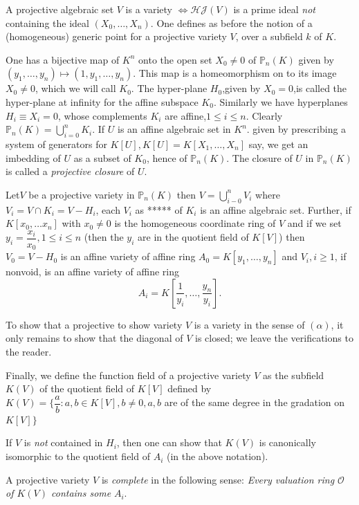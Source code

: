 A projective algebraic set $V$ is a variety $\Longleftrightarrow
\mathscr{H} \mathcal{J}(V)$ is a prime ideal \textit{ not } containing
the ideal $(X_0,\ldots,X_n)$. One defines as before the notion of a
(homogeneous) generic point for a projective variety $V$, over a
subfield $k$ of $K$. 
   
One has a bijective map of $K^n$ onto the open set $X_0 \neq 0$ of
$\mathbb{P}_n (K)$ given by $(y_1,\ldots,y_n)  \longmapsto
(1, y_1,\ldots,y_n)$. This map is a homeomorphism on to its
image $X_0 \neq 0$, which we will call $K_0$. The hyper-plane
$H_0$,given by $X_0 = 0$,is  
called the hyper-plane at infinity for the affine subspace
$K_0$. Similarly we have hyperplanes $H_i \equiv X_i =0$, whose
complements $K_i$ are affine,$1\leq i\leq n$. Clearly $\mathbb{P}_n
(K) = \bigcup \limits^{n}_{i=0} K_i$. If $U$ is an affine algebraic
set in $K^n$. given by prescribing a system of generators for $K[U],
K[U] = K[X_1,\ldots,X_n]$ say, we get an imbedding of $U$ as a subset
of $K_0$, hence of $\mathbb{P}_n(K)$. The closure of $U$ in
$\mathbb{P}_n (K)$ is called a \textit{ projective closure } of $U$. 

Let\pageoriginale $V$ be a projective variety in $\mathbb{P}_n (K)$ then $V= \bigcup
\limits^{n}_{i-0} V_i$ 
where $V_i = V \cap K_i = V-H_i$, each $V_i$ as ***** of $K_i$ is an
affine algebraic set. Further, if $K[x_0,\ldots x_n]$ with $x_0 \neq 0$
is the homogeneous coordinate ring of $V$ and if we set $y_i =
\dfrac{x_i}{x_0}, 1\leq i\leq n$ (then the $y_i$ are in the quotient
field of $K[V]$)  then $V_0  = V-H_0$ is an affine variety of affine
ring $A_0 = K[y_1,\ldots,y_n]$ and $V_i, i\ge 1$, if nonvoid, is an
affine variety of affine ring  
$$
A_i = K\left[\dfrac{1}{y_i},\ldots,\dfrac{y_n}{y_i}\right].
$$   

To show that a projective to show variety $V$ is a variety in the
sense of $(\alpha)$, it only remains to show that the diagonal of $V$
is closed; we leave the verifications to the reader. 

Finally, we define the function field of a projective variety $V$ as
the subfield $K(V)$ of the quotient field of $K[V]$ defined by $K (V)
= \Bigg\{ \dfrac{a}{b}: a,b \in K [V], b \neq 0, a,b$ are of the same
degree in the gradation on $K[V]\Bigg\}$  
 
If $V$ is \textit{ not } contained in $H_i$, then one can show that
$K(V)$ is canonically isomorphic to the quotient field of $A_i$ (in
the above notation). 

\begin{theorem}\label{chap1:sec1:thm1} %
  A projective variety $V$ is \textit{complete} in the following
  sense: \textit{Every valuation  ring  $\mathscr{O}$ of $K(V)$
    contains some } $A_i$. 
\end{theorem}

